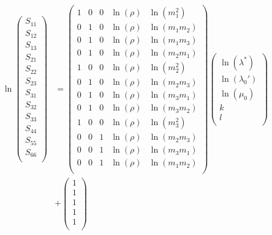 \documentclass[a4paper,fleqn]{DC_ArtStyle}
\begin{document}
	\begin{equation}
	\begin{split}
	\ln
	\begin{pmatrix}
	S_{11} \\
	S_{12} \\
	S_{13} \\
	S_{21} \\
	S_{22} \\
	S_{23} \\
	S_{31} \\
	S_{32} \\
	S_{33} \\
	S_{44} \\
	S_{55} \\
	S_{66} \\
	\end{pmatrix} & = \begin{pmatrix}
	1 & 0 & 0 & \ln(\rho) & \ln(m_1^2) \\
	0 & 1 & 0 & \ln(\rho) & \ln(m_1 m_2) \\
	0 & 1 & 0 & \ln(\rho) & \ln(m_1 m_3) \\
	0 & 1 & 0 & \ln(\rho) & \ln(m_2 m_1) \\
	1 & 0 & 0 & \ln(\rho) & \ln(m_2^2) \\
	0 & 1 & 0 & \ln(\rho) & \ln(m_2 m_3) \\
	0 & 1 & 0 & \ln(\rho) & \ln(m_3 m_1) \\
	0 & 1 & 0 & \ln(\rho) & \ln(m_3 m_2) \\
	1 & 0 & 0 & \ln(\rho) & \ln(m_3^2) \\
	0 & 0 & 1 & \ln(\rho) & \ln(m_2 m_3) \\
	0 & 0 & 1 & \ln(\rho) & \ln(m_3 m_1) \\
	0 & 0 & 1 & \ln(\rho) & \ln(m_1 m_2) \\
	\end{pmatrix} \begin{pmatrix}
	\ln(\lambda^{*}) \\
	\ln(\lambda_0') \\
	\ln(\mu_0) \\
	k \\
	l \\
	\end{pmatrix}\\ & + \begin{pmatrix}
	1 \\
	1 \\
	1 \\
	1 \\
	1 \\

\end{pmatrix}
\end{split}
\end{equation}
\end{document}
